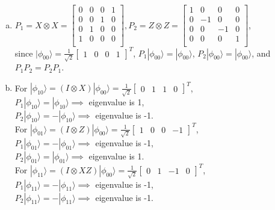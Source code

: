 \documentclass[11pt]{article}
\newenvironment{solution}
{\begin{mdframed}
[skipabove=\baselineskip,innertopmargin=\baselineskip,innerbottommargin=\baselineskip]
}{\end{mdframed}}
\begin{document}
\begin{solution}
\begin{enumerate}[(a)]
    \item $P_1 = X\otimes X = \begin{bmatrix}
    0&0&0&1 \\
    0&0&1&0 \\
    0&1&0&0 \\
    1&0&0&0 \\
    \end{bmatrix}, P_2 = Z\otimes Z = \begin{bmatrix}
    1&0&0&0 \\
    0&-1&0&0 \\
    0&0&-1&0 \\
    0&0&0&1 \\
    \end{bmatrix}$, \\ since
    $|\phi_{00}\rangle = \frac{1}{\sqrt{2}}\begin{bmatrix}1&0&0&1\end{bmatrix}^T$, $P_1|\phi_{00}\rangle=|\phi_{00}\rangle$, $P_2|\phi_{00}\rangle=|\phi_{00}\rangle$, and $P_1P_2 = P_2P_1$.
    \item For $|\phi_{10}\rangle = (I\otimes X)|\phi_{00}\rangle = \frac{1}{\sqrt{2}}\begin{bmatrix}0&1&1&0\end{bmatrix}^T$, \\
    $P_1|\phi_{10}\rangle = |\phi_{10}\rangle \implies$ eigenvalue is 1, \\
    $P_2|\phi_{10}\rangle =-|\phi_{10}\rangle \implies$ eigenvalue is -1. \\
    For $|\phi_{01}\rangle = (I\otimes Z)|\phi_{00}\rangle = \frac{1}{\sqrt{2}}\begin{bmatrix}1&0&0&-1\end{bmatrix}^T$, \\
    $P_1|\phi_{01}\rangle =-|\phi_{01}\rangle \implies$ eigenvalue is -1, \\
    $P_2|\phi_{01}\rangle = |\phi_{01}\rangle \implies$ eigenvalue is 1. \\
    For $|\phi_{11}\rangle = (I\otimes XZ)|\phi_{00}\rangle = \frac{1}{\sqrt{2}}\begin{bmatrix}0&1&-1&0\end{bmatrix}^T$, \\
    $P_1|\phi_{11}\rangle =-|\phi_{11}\rangle \implies$ eigenvalue is -1, \\
    $P_2|\phi_{11}\rangle =-|\phi_{11}\rangle \implies$ eigenvalue is -1. \\
    
\end{enumerate}
\end{solution}
\end{document}
